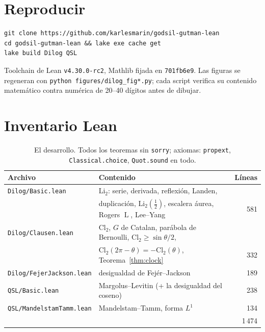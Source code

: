 \documentclass[11pt]{article}
\newcommand{\lean}[1]{\texttt{#1}}
\newcommand{\Li}{\mathrm{Li}_2}
\newcommand{\Cl}{\mathrm{Cl}_2}
\DeclareMathOperator{\Lrog}{L}
\begin{document}
\appendix

\section{Reproducir}\label{app:repro}

\begin{verbatim}
git clone https://github.com/karlesmarin/godsil-gutman-lean
cd godsil-gutman-lean && lake exe cache get
lake build Dilog QSL
\end{verbatim}
Toolchain de Lean \lean{v4.30.0-rc2}, Mathlib fijada en \lean{701fb6e9}. Las figuras se
regeneran con \lean{python figures/dilog\_fig*.py}; cada script verifica su contenido
matem\'atico contra num\'erica de 20--40 d\'igitos antes de dibujar.

\section{Inventario Lean}

\begin{table}[H]
\centering\small
\begin{tabular}{@{}llr@{}}
\toprule
\rowcolor{ggteal!18} Archivo & Contenido & L\'ineas\\
\midrule
\rowcolor{ggband!35} \lean{Dilog/Basic.lean} & $\Li$: serie, derivada, reflexi\'on, Landen,&\\
\rowcolor{ggband!35} & duplicaci\'on, $\Li(\frac12)$, escalera \'aurea, Rogers $\Lrog$, Lee--Yang & 581\\
\lean{Dilog/Clausen.lean} & $\Cl$, $G$ de Catalan, par\'abola de Bernoulli,
$\Cl\ge\sin\theta/2$,&\\
& $\Cl(2\pi-\theta)=-\Cl(\theta)$, Teorema~\ref{thm:clock} & 332\\
\rowcolor{ggband!35} \lean{Dilog/FejerJackson.lean} & desigualdad de Fej\'er--Jackson & 189\\
\lean{QSL/Basic.lean} & Margolus--Levitin (+ la desigualdad del coseno) & 238\\
\rowcolor{ggband!35} \lean{QSL/MandelstamTamm.lean} & Mandelstam--Tamm, forma $L^1$ & 134\\
\midrule
&& 1\,474\\
\bottomrule
\end{tabular}
\caption{El desarrollo. Todos los teoremas sin \lean{sorry}; axiomas:
\lean{propext}, \lean{Classical.choice}, \lean{Quot.sound} en todo.}
\label{tab:inventory}
\end{table}
\end{document}
